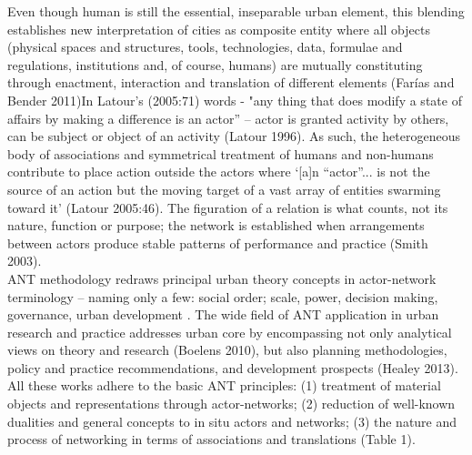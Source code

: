 \documentclass[11pt]{report}
\begin{document}
Even though human is still the essential, inseparable urban element, this blending establishes new interpretation of cities as composite entity where all objects (physical spaces and structures, tools, technologies, data, formulae and regulations, institutions and, of course, humans) are mutually constituting through enactment, interaction and translation of different elements (Farías and Bender 2011)In  Latour’s (2005:71) words - "any thing that does modify a state of affairs by making a difference is an actor” – actor is granted activity by others, can be subject or object of an activity  (Latour 1996). As such, the heterogeneous body of associations and symmetrical treatment of humans and non-humans contribute to place action outside the actors where ‘[a]n “actor”... is not the source of an action but the moving target of a vast array of entities swarming toward it’ (Latour 2005:46). The figuration of a relation is what counts, not its nature, function or purpose; the network is established when arrangements between actors produce stable patterns of performance and practice (Smith 2003).
\\

ANT methodology redraws principal urban theory concepts in actor-network terminology – naming only a few: social order; scale, power, decision making, governance, urban development . The wide field of ANT application in urban research and practice addresses urban core by encompassing not only analytical views on theory and research (Boelens 2010), but also planning methodologies, policy and practice recommendations, and development prospects (Healey 2013). All these works adhere to the basic ANT principles: (1) treatment of material objects and representations through actor-networks; (2) reduction of well-known dualities and general concepts to in situ actors and networks; (3) the nature and process of networking in terms of associations and translations (Table 1).
\\
\end{document}
